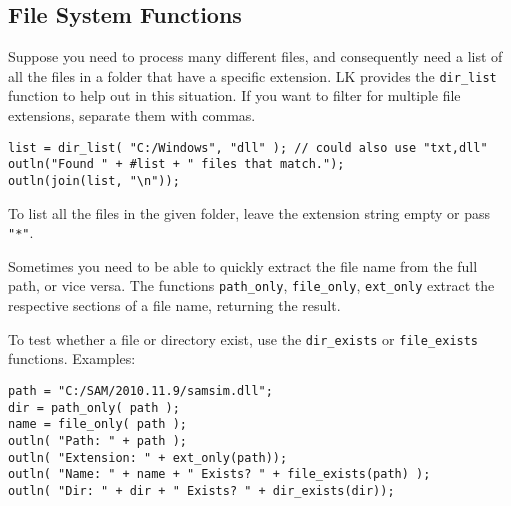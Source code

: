\documentclass{article}
\begin{document}
\subsection{File System Functions}

Suppose you need to process many different files, and consequently need a list of all the files in a folder that have a specific extension.  LK provides the \texttt{dir\_list} function to help out in this situation.  If you want to filter for multiple file extensions, separate them with commas.

\begin{verbatim}
list = dir_list( "C:/Windows", "dll" ); // could also use "txt,dll"
outln("Found " + #list + " files that match.");
outln(join(list, "\n"));
\end{verbatim}

To list all the files in the given folder, leave the extension string empty or pass \texttt{"*"}.

Sometimes you need to be able to quickly extract the file name from the full path, or vice versa.  The functions \texttt{path\_only}, \texttt{file\_only}, \texttt{ext\_only} extract the respective sections of a file name, returning the result.

To test whether a file or directory exist, use the \texttt{dir\_exists} or \texttt{file\_exists} functions.  Examples:

\begin{verbatim}
path = "C:/SAM/2010.11.9/samsim.dll";
dir = path_only( path );
name = file_only( path );
outln( "Path: " + path );
outln( "Extension: " + ext_only(path));
outln( "Name: " + name + " Exists? " + file_exists(path) );
outln( "Dir: " + dir + " Exists? " + dir_exists(dir));
\end{verbatim}



\end{document}

